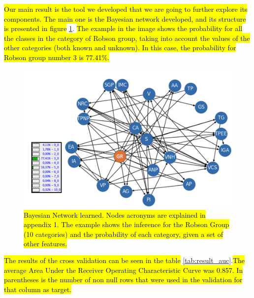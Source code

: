\hl{Our main result is the tool we developed that we are going to further explore its components. The main one is the Bayesian network developed, and its structure is presented in figure} \ref{fig:network}. \hl{The example in the image shows the probability for all the classes in the category of Robson group, taking into account the values of the other categories (both known and unknown). In this case, the probability for Robson group number 3 is 77.41\%. }
\begin{figure}[h!]
    \centering
    \caption{\hl{Bayesian Network learned. Nodes acronyms are explained in appendix 1. The example shows the inference for the Robson Group (10 categories) and the probability of each category, given a set of other features.} }\label{fig:network} 
    \includegraphics[scale=0.30]{imgs/new-bn.png}
    \end{figure}


\hl{The results of the cross validation can be seen in the table} \ref{tab:result_auc}.\hl{The average Area Under the Receiver Operating Characteristic Curve was 0.857. In parentheses is the number of non null rows that were used in the validation for that column as target.}



